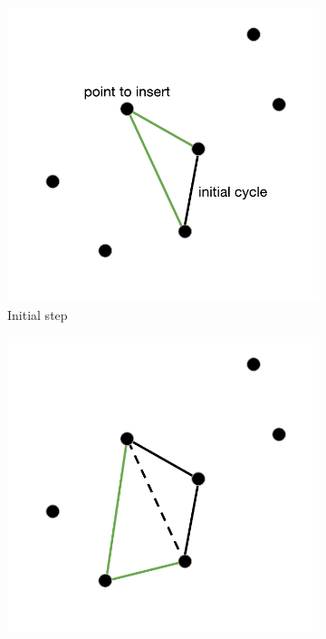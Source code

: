 \begin{figure}[h!]
  \centering
  \begin{subfigure}[b]{0.48\linewidth}
    \includegraphics[width=\linewidth]{media/insertion1.pdf}
     \caption{Initial step}
  \end{subfigure}
  \begin{subfigure}[b]{0.48\linewidth}
    \includegraphics[width=\linewidth]{media/insertion2.pdf}

\end{subfigure}
\end{figure}
